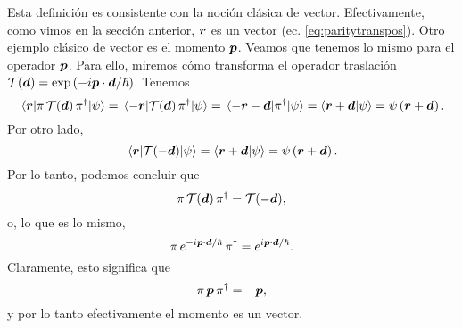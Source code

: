 \documentclass[10pt, a4paper]{article}
\numberwithin{equation}{subsection}
\begin{document}
Esta definición es consistente con la noción clásica de vector. Efectivamente,
como vimos en la sección anterior, $\vb*{r}$ es un vector (ec.
\eqref{eq:paritytranspos}). Otro ejemplo clásico de vector es el momento
$\vb*{p}$. Veamos que tenemos lo mismo para el operador $\vb*{p}$.
Para ello, miremos cómo transforma el operador traslación
$\mathcal{T}(\vb*{d}) = \exp\left(-i\vb*{p}\cdot\vb*{d}/\hbar\right)$.
Tenemos
\begin{equation}
  \matrixel{\vect{r}} {\parityop\,\translationop(\vect{d})\,\parityop^\dagger}
    {\psi}
  = \matrixel{-\vect{r}}{\translationop(\vect{d})\,\parityop^\dagger}{\psi}
  = \matrixel{-\vect{r} - \vect{d}}{\parityop^\dagger}{\psi}
  = \braket{\vect{r} + \vect{d}}{\psi}
  = \psi\left(\vect{r} + \vect{d}\right).
\end{equation}
Por otro lado,
\begin{equation}
  \matrixel{\vect{r}}{\translationop(-\vect{d})}{\psi}
  = \braket{\vect{r} + \vect{d}}{\psi}
  = \psi\left(\vect{r} + \vect{d}\right).
\end{equation}
Por lo tanto, podemos concluir que
\begin{equation} \label{eq:paritytranstrans}
  \pi\,\mathcal{T}(\vb*{d})\,\pi^\dagger = 
  \mathcal{T}(-\vb*{d}),
\end{equation}
o, lo que es lo mismo,
\begin{equation}
  \pi\,e^{-i\vb*{p}\cdot\vb*{d}/\hbar}\,\pi^\dagger =
  e^{i\vb*{p}\cdot\vb*{d}/\hbar}.
\end{equation}
Claramente, esto significa que
\begin{equation} \label{eq:paritytransmom}
  \pi\,\vb*{p}\,\pi^\dagger = -\vb*{p},
\end{equation}
y por lo tanto efectivamente el momento es un vector.
\end{document}
